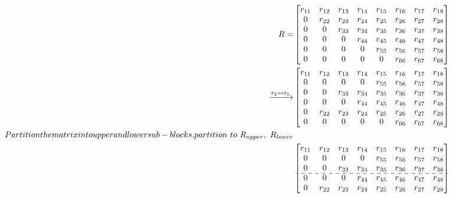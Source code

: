 \documentclass[12pt]{article}
\begin{document}
\begin{align*}
R =
 & \begin{bmatrix}
 r_{11} & r_{12} & r_{13} & r_{14} & r_{15} & r_{16} & r_{17} & r_{18}\\
 0      & r_{22} & r_{23} & r_{24} & r_{25} & r_{26} & r_{27} & r_{28}\\
 0      & 0      & r_{33} & r_{34} & r_{35} & r_{36} & r_{37} & r_{38}\\
 0      & 0      & 0      & r_{44} & r_{45} & r_{46} & r_{47} & r_{48}\\
 0      & 0      & 0      & 0      & r_{55} & r_{56} & r_{57} & r_{58}\\
 0      & 0      & 0      & 0      & 0      & r_{66} & r_{67} & r_{68}\\
\end{bmatrix}\\
\xrightarrow{r_{2} \leftrightarrow r_{5}}
&\begin{bmatrix}
 r_{11} & r_{12} & r_{13} & r_{14} & r_{15} & r_{16} & r_{17} & r_{18}\\
 0      & 0      & 0      & 0      & r_{55} & r_{56} & r_{57} & r_{58}\\
 0      & 0      & r_{33} & r_{34} & r_{35} & r_{36} & r_{37} & r_{38}\\
 0      & 0      & 0      & r_{44} & r_{45} & r_{46} & r_{47} & r_{48}\\
 0      & r_{22} & r_{23} & r_{24} & r_{25} & r_{26} & r_{27} & r_{28}\\
 0      & 0      & 0      & 0      & 0      & r_{66} & r_{67} & r_{68}\\
\end{bmatrix}\\
Partition the matrix into upper and lower sub-blocks.
partition\ to\ R_{upper},\ R_{lower}\\
&\begin{bmatrix}
 r_{11} & r_{12} & r_{13} & r_{14} & r_{15} & r_{16} & r_{17} & r_{18}\\
 0      & 0      & 0      & 0      & r_{55} & r_{56} & r_{57} & r_{58}\\
 0      & 0      & r_{33} & r_{34} & r_{35} & r_{36} & r_{37} & r_{38}\\
 \cdashline{1-8}
 0      & 0      & 0      & r_{44} & r_{45} & r_{46} & r_{47} & r_{48}\\
 0      & r_{22}  & r_{23} & r_{24} & r_{25} & r_{26} & r_{27} & r_{28}\\

\end{bmatrix}
\end{align*}
\end{document}
